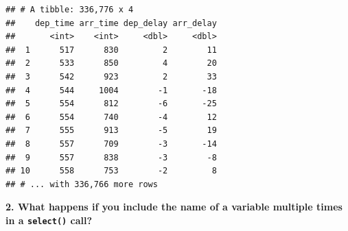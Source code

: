 \documentclass[]{book}
\newenvironment{Shaded}{\begin{snugshade}}{\end{snugshade}}
\newcommand{\CommentTok}[1]{\textcolor[rgb]{0.56,0.35,0.01}{\textit{#1}}}
\newcommand{\KeywordTok}[1]{\textcolor[rgb]{0.13,0.29,0.53}{\textbf{#1}}}
\newcommand{\NormalTok}[1]{#1}
\newcommand{\OperatorTok}[1]{\textcolor[rgb]{0.81,0.36,0.00}{\textbf{#1}}}
\newcommand{\StringTok}[1]{\textcolor[rgb]{0.31,0.60,0.02}{#1}}
\theoremstyle{definition}
\theoremstyle{definition}
\theoremstyle{definition}
\theoremstyle{remark}
\begin{document}
\begin{Shaded}
\end{Shaded}

\begin{Shaded}
\end{Shaded}

\begin{verbatim}
## # A tibble: 336,776 x 4
##    dep_time arr_time dep_delay arr_delay
##       <int>    <int>     <dbl>     <dbl>
##  1      517      830         2        11
##  2      533      850         4        20
##  3      542      923         2        33
##  4      544     1004        -1       -18
##  5      554      812        -6       -25
##  6      554      740        -4        12
##  7      555      913        -5        19
##  8      557      709        -3       -14
##  9      557      838        -3        -8
## 10      558      753        -2         8
## # ... with 336,766 more rows
\end{verbatim}

\textbf{2. What happens if you include the name of a variable multiple
times in a \texttt{select()} call?}
\end{document}
